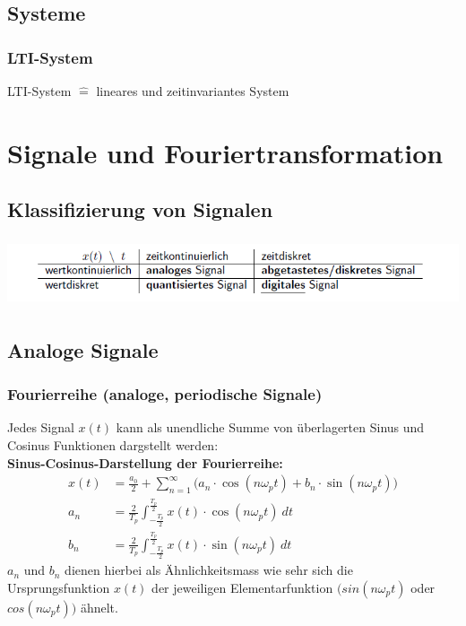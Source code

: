 \documentclass[12pt,a4paper]{scrartcl}
\begin{document}
\subsection{Systeme}
\label{sec:sub:systeme}

\subsubsection{LTI-System}
\label{sec:sub:lti-system}
LTI-System $\widehat{=}$ lineares und zeitinvariantes System


\newpage
\section{Signale und Fouriertransformation}
\label{sec:signale-und-fouriertransformation}


\subsection{Klassifizierung von Signalen}
\label{sec:sub:klassifizierung-von-signalen}
\includegraphics[height=2cm]{Pictures/Einheiten.png}


\subsection{Analoge Signale}
\label{sec:sub:analoge-signale}

\subsubsection{Fourierreihe (analoge, periodische Signale)}
\label{sec:sub:sub:fourier-reihe}

Jedes Signal $x(t)$ kann als unendliche Summe von überlagerten Sinus und Cosinus Funktionen dargstellt werden: \\

\noindent  \textbf{Sinus-Cosinus-Darstellung der Fourierreihe:}
\begin{equation}
  \label{eq:1}
  \begin{split}
  x(t) &=\frac{a_0}{2} + \sum_{n=1}^{\infty}\big(a_n \cdot \cos(n \omega_p t) + b_n \cdot \sin(n \omega_p t)   \big)  \\
a_n &= \frac{2}{T_p} \int_{-\frac{T_p}{2}}^{\frac{T_p}{2}} x(t) \cdot \cos(n\omega_p t)\ dt \\
b_n &= \frac{2}{T_p} \int_{-\frac{T_p}{2}}^{\frac{T_p}{2}} x(t) \cdot \sin(n\omega_p t)\ dt
    \end{split}
\end{equation}
\noindent $a_n$ und $b_n$ dienen hierbei als Ähnlichkeitsmass wie sehr sich die Ursprungsfunktion $x(t)$ der jeweiligen Elementarfunktion $\big(sin(n\omega_p t)$ oder $cos(n\omega_p t)\big)$ ähnelt.\\
\end{document}
